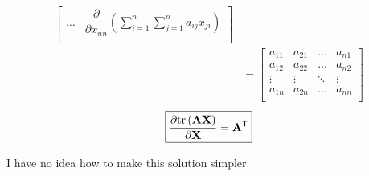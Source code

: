 \documentclass{article}
\newcommand{\trans}{\mathsf{T}}
\begin{document}
\begin{align*}
\begin{bmatrix}
        \dots & 
        \displaystyle \dfrac{\partial}{\partial x_{nn}} \left( \sum_{i = 1}^{n} \sum_{j = 1}^{n} a_{ij}x_{ji} \right) \\
    \end{bmatrix} \\
    &= \begin{bmatrix}
            a_{11} & a_{21} & \dots & a_{n1} \\
            a_{12} & a_{22} & \dots & a_{n2} \\
            \vdots & \vdots & \ddots & \vdots \\
            a_{1n} & a_{2n} & \dots & a_{nn} \\
        \end{bmatrix}
\end{align*}
\begin{align}
    \boxed{\dfrac{\partial \textnormal{tr}\left(\mathbf{A} \mathbf{X}\right)}{\partial \mathbf{X}} = \mathbf{A}^\trans}
\end{align}

I have no idea how to make this solution simpler.
\end{document}
